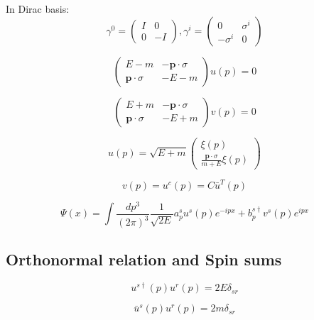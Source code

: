 \documentclass[12pt]{book}
\begin{document}
In Dirac basis:
\begin{equation}
	\gamma^0=\begin{pmatrix}
		I&0\\
		0&-I
	\end{pmatrix},
	\gamma^i=\begin{pmatrix}
		0&\sigma^i\\
		-\sigma^i&0
	\end{pmatrix}
\end{equation}

\begin{equation}
	\begin{pmatrix}
		E-m&-\bm{p}\cdot\sigma\\
		\bm{p}\cdot\sigma&-E-m
	\end{pmatrix}
	u(p)=0
\end{equation}

\begin{equation}
	\begin{pmatrix}
		E+m&-\bm{p}\cdot\sigma\\
		\bm{p}\cdot\sigma&-E+m
	\end{pmatrix}
	v(p)=0
\end{equation}

\begin{equation}
	u(p)=\sqrt{E+m}\begin{pmatrix}
		\xi(p)\\
		\frac{\bm{p}\cdot\sigma}{m+E}\xi(p)
	\end{pmatrix}
\end{equation}

\begin{equation}
	v(p)=u^c(p)=C\bar u^T(p)
\end{equation}

\begin{equation}
	\Psi(x)=\int\frac{dp^3}{(2\pi)^3}\frac 1{\sqrt{2E}}a_p^su^s(p)e^{-ipx}+b_p^{s\dagger} v^s(p)e^{ipx}
\end{equation}

\subsection{Orthonormal relation and Spin sums}

\begin{equation}
	u^{s\dagger}(p)u^r(p)=2E\delta_{sr}
\end{equation}

\begin{equation}
	\bar u^{s}(p)u^r(p)=2m\delta_{sr}
\end{equation}
\end{document}
